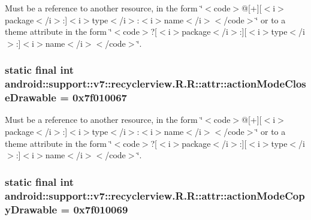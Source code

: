 Must be a reference to another resource, in the form \char`\"{}$<$code$>$@\mbox{[}+\mbox{]}\mbox{[}$<$i$>$package$<$/i$>$:\mbox{]}$<$i$>$type$<$/i$>$:$<$i$>$name$<$/i$>$$<$/code$>$\char`\"{} or to a theme attribute in the form \char`\"{}$<$code$>$?\mbox{[}$<$i$>$package$<$/i$>$:\mbox{]}\mbox{[}$<$i$>$type$<$/i$>$:\mbox{]}$<$i$>$name$<$/i$>$$<$/code$>$\char`\"{}. \hypertarget{classandroid_1_1support_1_1v7_1_1recyclerview_1_1_r_1_1attr_8b53c6137580e0e5943a5c594168dde9}{
\subsubsection[{actionModeCloseDrawable}]{\setlength{\rightskip}{0pt plus 5cm}static final int android::support::v7::recyclerview.R.R::attr::actionModeCloseDrawable = 0x7f010067}}
\label{classandroid_1_1support_1_1v7_1_1recyclerview_1_1_r_1_1attr_8b53c6137580e0e5943a5c594168dde9}


Must be a reference to another resource, in the form \char`\"{}$<$code$>$@\mbox{[}+\mbox{]}\mbox{[}$<$i$>$package$<$/i$>$:\mbox{]}$<$i$>$type$<$/i$>$:$<$i$>$name$<$/i$>$$<$/code$>$\char`\"{} or to a theme attribute in the form \char`\"{}$<$code$>$?\mbox{[}$<$i$>$package$<$/i$>$:\mbox{]}\mbox{[}$<$i$>$type$<$/i$>$:\mbox{]}$<$i$>$name$<$/i$>$$<$/code$>$\char`\"{}. \hypertarget{classandroid_1_1support_1_1v7_1_1recyclerview_1_1_r_1_1attr_d8f02af5521e40d0416edc5a31541e62}{
\subsubsection[{actionModeCopyDrawable}]{\setlength{\rightskip}{0pt plus 5cm}static final int android::support::v7::recyclerview.R.R::attr::actionModeCopyDrawable = 0x7f010069}}
\label{classandroid_1_1support_1_1v7_1_1recyclerview_1_1_r_1_1attr_d8f02af5521e40d0416edc5a31541e62}


